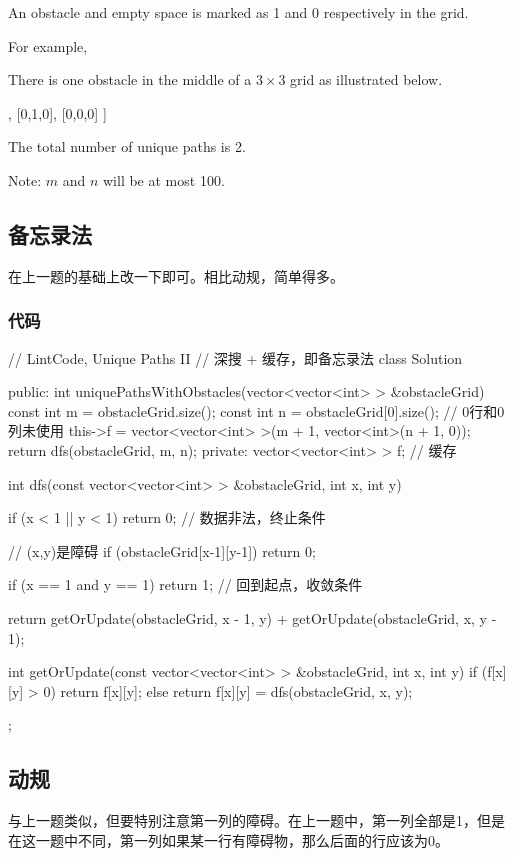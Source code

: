 An obstacle and empty space is marked as 1 and 0 respectively in the grid.

For example,

There is one obstacle in the middle of a $3 \times 3$ grid as illustrated below.
\begin{Code}
[
  [0,0,0],
  [0,1,0],
  [0,0,0]
]
\end{Code}

The total number of unique paths is 2.

Note: $m$ and $n$ will be at most 100.


\subsection{备忘录法}
在上一题的基础上改一下即可。相比动规，简单得多。

\subsubsection{代码}
\begin{Code}
// LintCode, Unique Paths II
// 深搜 + 缓存，即备忘录法
class Solution {
public:
    int uniquePathsWithObstacles(vector<vector<int> > &obstacleGrid) {
        const int m = obstacleGrid.size();
        const int n = obstacleGrid[0].size();
        // 0行和0列未使用
        this->f = vector<vector<int> >(m + 1, vector<int>(n + 1, 0));
        return dfs(obstacleGrid, m, n);
    }
private:
    vector<vector<int> > f;  // 缓存

    int dfs(const vector<vector<int> > &obstacleGrid,
            int x, int y) {
        if (x < 1 || y < 1) return 0; // 数据非法，终止条件

        // (x,y)是障碍
        if (obstacleGrid[x-1][y-1]) return 0;

        if (x == 1 and y == 1) return 1; // 回到起点，收敛条件

        return getOrUpdate(obstacleGrid, x - 1, y) +
                getOrUpdate(obstacleGrid, x, y - 1);
    }

    int getOrUpdate(const vector<vector<int> > &obstacleGrid,
            int x, int y) {
        if (f[x][y] > 0) return f[x][y];
        else return f[x][y] = dfs(obstacleGrid, x, y);
    }
};
\end{Code}


\subsection{动规}
与上一题类似，但要特别注意第一列的障碍。在上一题中，第一列全部是1，但是在这一题中不同，第一列如果某一行有障碍物，那么后面的行应该为0。


